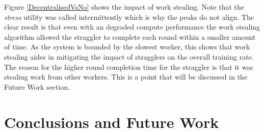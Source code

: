 \documentclass[12pt]{article}
\begin{document}
Figure \ref{DecentralisedVsNo} shows the impact of work stealing. Note that the \textit{stress} utility was called intermittently which is why the peaks do not align. The clear result is that even with an degraded compute performance the work stealing algorithm allowed the straggler to complete each round within a smaller amount of time. As the system is bounded by the slowest worker, this shows that work stealing aides in mitigating the impact of stragglers on the overall training rate.
\newline
\newline
The reason for the higher  round completion time for the straggler is that it was stealing work from other workers. This is a point that will be discussed in the Future Work section.

\newpage

\section{Conclusions and Future Work}
\end{document}
